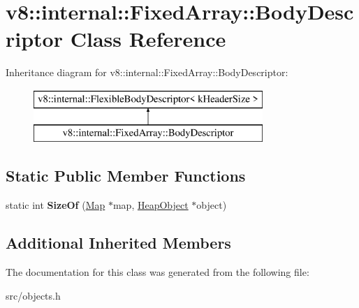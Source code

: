 \hypertarget{classv8_1_1internal_1_1_fixed_array_1_1_body_descriptor}{}\section{v8\+:\+:internal\+:\+:Fixed\+Array\+:\+:Body\+Descriptor Class Reference}
\label{classv8_1_1internal_1_1_fixed_array_1_1_body_descriptor}
Inheritance diagram for v8\+:\+:internal\+:\+:Fixed\+Array\+:\+:Body\+Descriptor\+:\begin{figure}[H]
\begin{center}
\leavevmode
\includegraphics[height=2.000000cm]{classv8_1_1internal_1_1_fixed_array_1_1_body_descriptor}
\end{center}
\end{figure}
\subsection*{Static Public Member Functions}
\begin{DoxyCompactItemize}
\item 
\hypertarget{classv8_1_1internal_1_1_fixed_array_1_1_body_descriptor_a2612eea7a90969d0d64ba8f347ee5ec6}{}static int {\bfseries Size\+Of} (\hyperlink{classv8_1_1internal_1_1_map}{Map} $\ast$map, \hyperlink{classv8_1_1internal_1_1_heap_object}{Heap\+Object} $\ast$object)\label{classv8_1_1internal_1_1_fixed_array_1_1_body_descriptor_a2612eea7a90969d0d64ba8f347ee5ec6}

\end{DoxyCompactItemize}
\subsection*{Additional Inherited Members}


The documentation for this class was generated from the following file\+:\begin{DoxyCompactItemize}
\item 
src/objects.\+h\end{DoxyCompactItemize}
